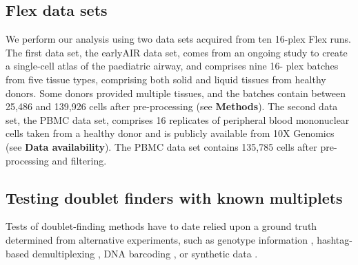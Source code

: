 \documentclass[unnumsec,webpdf,modern,large]{oup-authoring-template}
\begin{document}
	\subsection{Flex data sets}
	\label{subsec: data}
	
	We perform our analysis using two data sets acquired from ten 16-plex Flex runs. 
	The first data set, the earlyAIR data set, comes from an ongoing study to create a single-cell atlas of the paediatric airway, and comprises nine 16- plex batches from five tissue types, comprising both solid and liquid tissues from healthy donors. 
	Some donors provided multiple tissues, and the batches contain between 25,486 and 139,926 cells after pre-processing (see \textbf{Methods}). 
	The second data set, the PBMC data set, comprises 16 replicates of peripheral blood mononuclear cells taken from a healthy donor and is publicly available from 10X Genomics (see \textbf{Data availability}).  
	The PBMC data set contains 135,785 cells after pre-processing and filtering.
	
	\subsection{Testing doublet finders with known multiplets}

	Tests of doublet-finding methods have to date relied upon a ground truth determined from alternative experiments, such as genotype information 
	\citep{Neavin2024}, hashtag-based demultiplexing \citep{Curion2024}, DNA barcoding
	\citep{Zhang2024}, or synthetic data \citep{Xi2021}.
	
\end{document}

